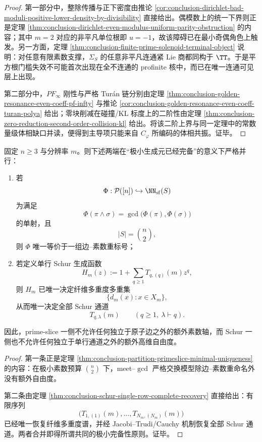 \begin{proof}
第一部分中，整除传播与正下密度由推论
\ref{cor:conclusion-dirichlet-bad-moduli-positive-lower-density-by-divisibility}
直接给出。偶模数上的统一下界则正是定理
\ref{thm:conclusion-dirichlet-even-modulus-uniform-parity-obstruction}
的内容；其中 \(m=2\) 对应的非平凡单位根即 \(u=-1\)，故该障碍已在最小奇偶角色上触发。另一方面，定理
\ref{thm:conclusion-finite-prime-solenoid-terminal-object}
说明：对任意有限素数支撑，\(\Sigma_S\) 的任意非平凡连通紧 Lie 商都同构于 \(\TT\)。于是平方根门槛失效不可能首次出现在全不连通的 profinite 核中，而已在唯一连通可见层上出现。

第二部分中，\(PF_\infty\) 刚性与严格 Tur\'an 链分别由定理
\ref{thm:conclusion-golden-resonance-even-coeff-pf-infty}
与推论
\ref{cor:conclusion-golden-resonance-even-coeff-turan-polya}
给出；零块削减在碰撞/\(\mathrm{KL}\) 标度上的二阶性由定理
\ref{thm:conclusion-zero-reduction-second-order-collision-kl}
给出。将该二阶上界与同一定理中的常数量级体相缺口并读，便得到主导项只能来自 \(C_\varphi\) 所编码的体相共振。证毕。
\end{proof}

\begin{theorem}\label{thm:derived-primeslice-schur-common-minimal-completeness}
固定 \(n\ge 3\) 与分辨率 \(m\)。则下述两端在“极小生成元已经完备”的意义下严格并行：
\begin{enumerate}
\normalfont
  \item 若
  \[
  \Phi:\mathcal P([n])\hookrightarrow \NN_{\mathrm{sf}}(S)
  \]
  为满足
  \[
  \Phi(\pi\wedge \sigma)=\gcd\bigl(\Phi(\pi),\Phi(\sigma)\bigr)
  \]
  的单射，且
  \[
  |S|=\binom n2,
  \]
  则 \(\Phi\) 唯一等价于一组边--素数重标号；
  \item 若定义单行 Schur 生成函数
  \[
  H_m(z):=1+\sum_{q\ge 1}T_{q,(q)}(m)z^q,
  \]
  则 \(H_m\) 已唯一决定纤维多重度多重集
  \[
  \{d_m(x):x\in X_m\},
  \]
  从而唯一决定全部 Schur 通道
  \[
  T_{q,\lambda}(m)
  \qquad
  (q\ge 1,\ \lambda\vdash q).
  \]
\end{enumerate}
因此，prime-slice 一侧不允许任何独立于原子边之外的额外素数轴，而 Schur 一侧也不允许任何独立于单行通道之外的额外高维自由度。
\end{theorem}

\begin{proof}
第一条正是定理
\ref{thm:conclusion-partition-primeslice-minimal-uniqueness}
的内容：在极小素数预算 \(\binom n2\) 下，meet--\(\gcd\) 严格交换模型除边--素数重命名外没有额外自由度。

第二条由定理
\ref{thm:conclusion-schur-single-row-complete-recovery}
直接给出：有限序列
\[
\bigl(T_{1,(1)}(m),\dots,T_{N_m,(N_m)}(m)\bigr)
\]
已经唯一恢复纤维多重度谱，并经 Jacobi--Trudi/Cauchy 机制恢复全部 Schur 通道。两者合并即得所谓共同的极小完备性原则。证毕。
\end{proof}

